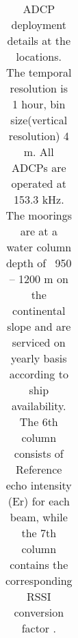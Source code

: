 \documentclass{article}
\begin{document}

\linespread{1.5}	
{\footnotesize 	 %
}	
\newpage
{} 

\linespread{1} 	
\begin{table}[htbp]

	{\footnotesize

		\captionsetup{justification=justified,font=footnotesize,skip=0.05\baselineskip} %
		\caption{ADCP deployment details at the locations. The temporal resolution is 1 hour, bin size(vertical resolution) 4 m. All ADCPs are operated at 153.3 kHz. The moorings are at a water column depth of ~950 -- 1200 m on the continental slope and are serviced on yearly basis according to ship availability. The 6th column consists of Reference echo intensity (Er) for each beam, while the 7th column contains the corresponding RSSI conversion factor \citep{deines1999backscatter}.}
		\begin{adjustwidth}{0in}{0in} 
			\begin{tabular}{ccccccc}
				

\end{tabular}
\end{adjustwidth}}
\end{table}
\end{document}
